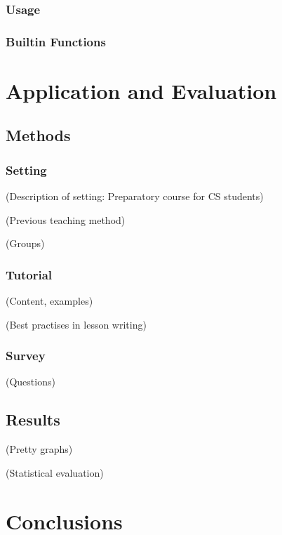\documentclass[twoside]{scrreprt}
\begin{document}
\subsection{Usage}

\subsection{Builtin Functions}

\chapter{Application and Evaluation}

\section{Methods}

\subsection{Setting}

                (Description of setting: Preparatory course for CS students)

                (Previous teaching method)

                (Groups)

\subsection{Tutorial}

                (Content, examples)

                (Best practises in lesson writing)

\subsection{Survey}

                (Questions)

\section{Results}

            (Pretty graphs)

            (Statistical evaluation)

\chapter{Conclusions}
\end{document}
